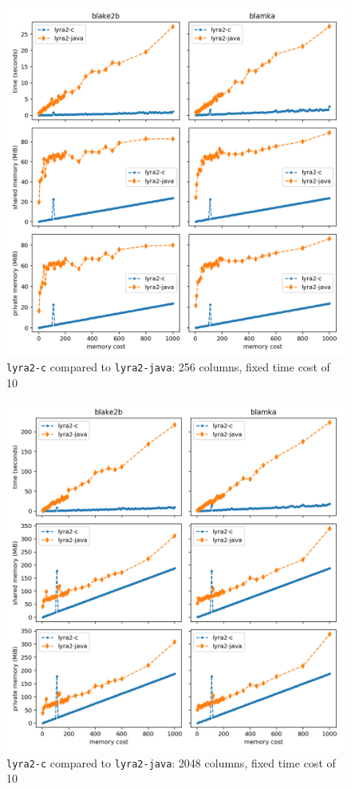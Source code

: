 \begin{figure}[H]
    \centering
    \includegraphics[width=\linewidth]{figures/mcost_256}
    \caption{\texttt{lyra2-c} compared to \texttt{lyra2-java}: 256 columns, fixed time cost of 10}
    \label{figure:mcost_256}
\end{figure}

\begin{figure}[H]
    \centering
    \includegraphics[width=\linewidth]{figures/mcost_2048}
    \caption{\texttt{lyra2-c} compared to \texttt{lyra2-java}: 2048 columns, fixed time cost of 10}
    \label{figure:mcost_2048}
\end{figure}

